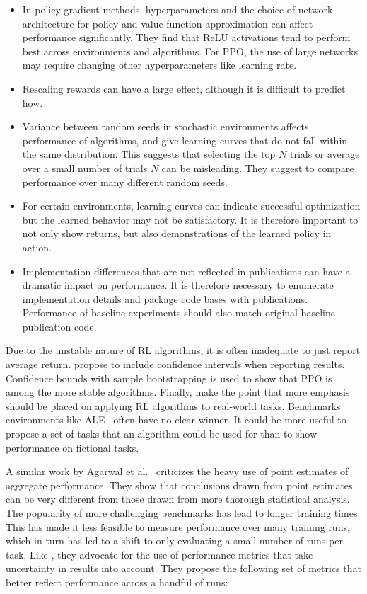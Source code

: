 \begin{itemize}
    \item In policy gradient methods, hyperparameters and the choice of network architecture for policy and value function approximation can affect performance significantly.
    They find that ReLU activations tend to perform best across environments and algorithms.
    For PPO, the use of large networks may require changing other hyperparameters like learning rate.
    \item Rescaling rewards can have a large effect, although it is difficult to predict how.
    \item Variance between random seeds in stochastic environments affects performance of algorithms, and give learning curves that do not fall within the same distribution.
    This suggests that selecting the top \(N\) trials or average over a small number of trials \(N\) can be misleading. They suggest to compare performance over many different random seeds.
    \item For certain environments, learning curves can indicate successful optimization but the learned behavior may not be satisfactory.
    It is therefore important to not only show returns, but also demonstrations of the learned policy in action.
    \item Implementation differences that are not reflected in publications can have a dramatic impact on performance.
    It is therefore necessary to enumerate implementation details and package code bases with publications.
    Performance of baseline experiments should also match original baseline publication code.
\end{itemize}

Due to the unstable nature of RL algorithms, it is often inadequate to just report average return.
\cite{henderson_matters_2018} propose to include confidence intervals when reporting results.
Confidence bounds with sample bootstrapping is used to show that PPO is among the more stable algorithms.
Finally, \cite{henderson_matters_2018} make the point that more emphasis should be placed on applying RL algorithms to real-world tasks.
Benchmarks environments like ALE~\cite{arcade} often have no clear winner.
It could be more useful to propose a set of tasks that an algorithm could be used for than to show performance on fictional tasks.

A similar work by Agarwal et al.~\cite{agarwal_rlliable_2022} criticizes the heavy use of point estimates of aggregate performance.
They show that conclusions drawn from point estimates can be very different from those drawn from more thorough statistical analysis. 
The popularity of more challenging benchmarks has lead to longer training times.
This has made it less feasible to measure performance over many training runs,
which in turn has led to a shift to only evaluating a small number of runs per task.
Like \cite{henderson_matters_2018}, they advocate for the use  of performance metrics that take uncertainty in results into account.
They propose the following set of metrics that better reflect performance across a handful of runs:


